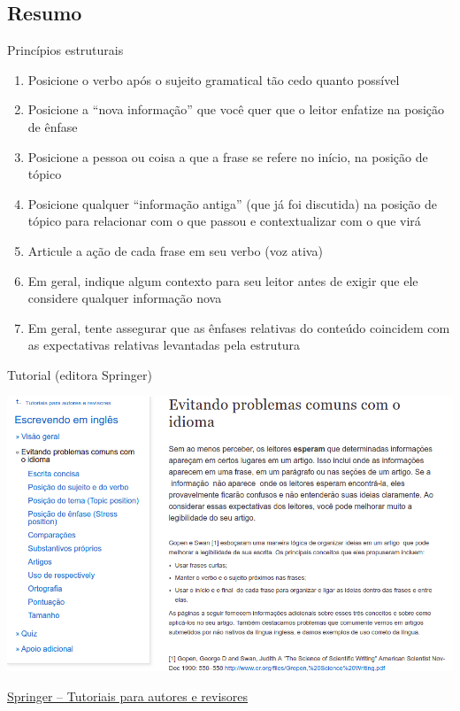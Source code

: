 \documentclass{beamer}
\begin{document}
\subsection{Resumo}

\begin{frame}{Princípios estruturais}

  \begin{enumerate}
    \scriptsize
  \item Posicione o verbo \alert{após} o sujeito gramatical \alert{tão
      cedo quanto possível}
  \item Posicione a ``nova informação'' que você quer que o leitor
    enfatize na \alert{posição de ênfase}
  \item Posicione a pessoa ou coisa a que a frase se refere no início,
    na \alert{posição de tópico}
  \item Posicione qualquer ``informação antiga'' (que já foi
    discutida) na \alert{posição de tópico} para relacionar com o que
    passou e contextualizar com o que virá
  \item Articule a ação de cada frase em seu verbo (\alert{voz ativa})
  \item Em geral, indique algum contexto para seu leitor antes de
    exigir que ele considere qualquer informação nova
  \item Em geral, tente assegurar que as ênfases relativas do conteúdo
    coincidem com as expectativas relativas levantadas pela estrutura
  \end{enumerate}
\end{frame}

\begin{frame}{Tutorial (editora Springer)}
  \begin{center}
    \includegraphics[width=.9\textwidth]{Escrita/springer-tutorial}
  \end{center}
  \vfill \scriptsize \hfill
  \href{https://www.springer.com/br/authors-editors/authorandreviewertutorials/writinginenglish/avoiding-common-language-issues/12012044}
  {Springer -- Tutoriais para autores e revisores}
\end{frame}
\end{document}
